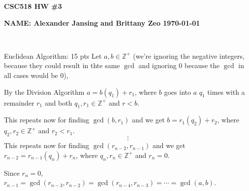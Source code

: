 \documentclass[12pt]{article}
\makeatletter
\newcommand{\<}{\langle}
\renewcommand{\>}{\rangle}
\newenvironment{problem}{\@startsection
       {section}
       {1}
       {-.2em}
       {-3.5ex plus -1ex minus -.2ex}
       {2.3ex plus .2ex}
       {\pagebreak[3]
       \large\bf\noindent{Problem }
       }
       }
       {%
       \begin{center}\large\bf \end{center}}
\def\ZZ{\mathbb{Z}}
\makeatother
\begin{document}
\centerline{\bf CSC518  \hfill HW \#3}
\centerline{\bf NAME: Alexander Jansing and Brittany Zeo \hfill \today}

\

\noindent

\begin{problem}{Euclidean Algorithm: 15 pts}
Let $a,b \in \ZZ^+$ (we're ignoring the negative integers, because they could result in thte same $\gcd$ and ignoring $0$ because the $\gcd$ in all cases would be $0$),

By the Division Algorithm $a = b(q_1) + r_1$, where $b$ goes into $a$ $q_1$ times with a remainder $r_1$ and both $q_1, r_1 \in \ZZ^+$ and $r<b$.

This repeats now for finding $\gcd \left( b,r_1 \right)$ and we get $b = r_1(q_2) + r_2$, where $q_2, r_2 \in \ZZ^+$ and $r_2<r_1$.
$$\vdots$$
This repeats now for finding $\gcd \left( r_{n-2},r_{n-1} \right)$ and we get $r_{n-2} = r_{n-1}(q_n) + r_n$, where $q_n, r_n \in \ZZ^+$ and $r_n = 0$.

Since $r_n = 0$, $r_{n-1} = \gcd \left( r_{n-3}, r_{n-2} \right) = \gcd \left( r_{n-4}, r_{n-3} \right) = \cdots = \gcd \left( a, b \right)$.
\end{problem}
\end{document}
